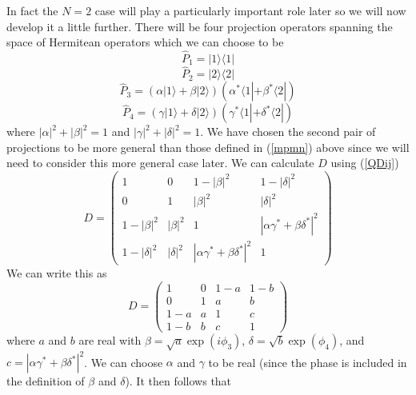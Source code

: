\documentclass[10pt,twocolumn]{article}
\begin{document}
In fact the $N=2$ case will play a particularly important role later so
we will now develop it a little further.  There will be four projection
operators spanning the space of Hermitean operators which we can choose
to be
\begin{equation}
\hat{P}_1=|1\rangle\langle 1|
\end{equation}
\begin{equation}
\hat{P}_2=|2\rangle\langle 2|
\end{equation}
\begin{equation}
\hat{P}_3=(\alpha|1\rangle+\beta|2\rangle)
(\alpha^*\langle 1|+\beta^*\langle 2|)
\end{equation}
\begin{equation}
\hat{P}_4=(\gamma|1\rangle+\delta|2\rangle)
(\gamma^*\langle 1|+\delta^*\langle 2|)
\end{equation}
where $|\alpha|^2+|\beta|^2=1$ and $|\gamma|^2+|\delta|^2=1$.
We have chosen the second pair of projections to be more general than
those defined in (\ref{mpmn}) above since we will need to consider this
more general case later.
We can calculate $D$ using (\ref{QDij})
\begin{equation}
D=\left( \begin{matrix}
       1 & 0 & 1-|\beta|^2 & 1-|\delta|^2 \\
       0 & 1 &  |\beta|^2 &   |\delta|^2  \\
     1-|\beta|^2 & |\beta|^2 & 1 & |\alpha\gamma^* +\beta\delta^*|^2 \\
     1-|\delta|^2 & |\delta|^2 & |\alpha\gamma^* +\beta\delta^*|^2 & 1
   \end{matrix} \right)
\end{equation}
We can write this as
\begin{equation}\label{QtwodD}
D=\left( \begin{array}{cccc} 1 &  0 &  1-a & 1-b \\
                             0 &  1 &   a  &  b  \\
                             1-a&  a &  1 &  c  \\
                            1-b &  b &  c &  1   \end{array} \right)
\end{equation}
where $a$ and $b$ are real with $\beta=\sqrt{a} \exp(i\phi_3)$,
$\delta=\sqrt{b} \exp(\phi_4)$, and
$c=|\alpha\gamma^* +\beta\delta^*|^2$. We can choose $\alpha$ and
$\gamma$ to be real (since the phase is included in the definition of
$\beta$ and $\delta$).  It then follows that
\end{document}
